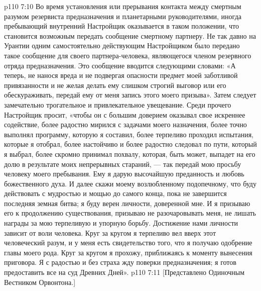 \vs p110 7:10 \pc Во время установления или прерывания контакта между смертным разумом резервиста предназначения и планетарными руководителями, иногда пребывающий внутренний Настройщик оказывается в таком положении, что становится возможным передать сообщение смертному партнеру. Не так давно на Урантии одним самостоятельно действующим Настройщиком было передано такое сообщение для своего партнера\hyp{}человека, являющегося членом резервного отряда предназначения. Это сообщение вводится следующими словами: «А теперь, не нанося вреда и не подвергая опасности предмет моей заботливой привязанности и не желая делать ему слишком строгий выговор или его обескураживать, передай ему от меня запись этого моего призыва». Затем следует замечательно трогательное и привлекательное увещевание. Среди прочего Настройщик просит, «чтобы он с большим доверием оказывал свое искреннее содействие, более радостно мирился с задачами моего назначения, более точно выполнял программу, которую я составил, более терпеливо проходил испытания, которые я отобрал, более настойчиво и более радостно следовал по пути, который я выбрал, более скромно принимал похвалу, которая, быть может, выпадет на его долю в результате моих непрерывных стараний, --- так передай мою просьбу человеку моего пребывания. Ему я дарую высочайшую преданность и любовь божественного духа. И далее скажи моему возлюбленному подопечному, что буду действовать с мудростью и мощью до самого конца, пока не завершится последняя земная битва; я буду верен личности, доверенной мне. И я призываю его к продолжению существования, призываю не разочаровывать меня, не лишать награды за мою терпеливую и упорную борьбу. Достижение нами личности зависит от воли человека. Круг за кругом я терпеливо вел вверх этот человеческий разум, и у меня есть свидетельство того, что я получаю одобрение главы моего рода. Круг за кругом я прохожу, приближаясь к моменту вынесения приговора. Я с радостью и без страха жду поверки предназначения; я готов предоставить все на суд Древних Дней».
\vsetoff
\vs p110 7:11 [Представлено Одиночным Вестником Орвонтона.]

